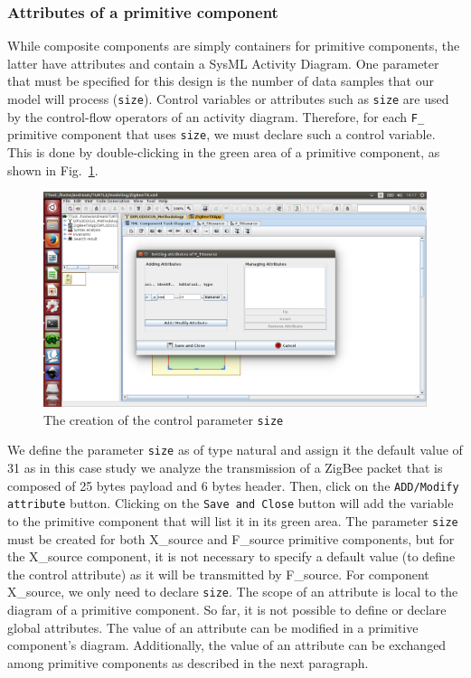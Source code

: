 \documentclass{llncs}
\newcommand{\screenshotsize}{1.0\textwidth}
\begin{document}
\subsubsection{Attributes of a primitive component}
%
While composite components are simply containers for primitive components, the latter have attributes and contain a
SysML Activity Diagram. One parameter that must be specified for this design is
the number of data samples that our model will process (\texttt{size}). Control
variables or attributes such as \texttt{size} are used by the control-flow operators of an activity diagram. Therefore, for each \texttt{F\_} primitive component that uses \texttt{size}, we must
declare such a control variable. This is done by double-clicking in the green area of a primitive component, as shown in
Fig.~\ref{fig:Src3}.
%
\begin{figure}[!htbp]
	\centering
	\includegraphics[width=\screenshotsize]{figures/screenshot/Src3.png}
	\caption{The creation of the control parameter \texttt{size}}
	\label{fig:Src3}
\end{figure}
%
We define the parameter \texttt{size} as of type natural and assign it the default value of 31 as in this case study we
analyze the transmission of a ZigBee packet that is composed of 25 bytes payload and 6 bytes header. Then, click on the
\texttt{ADD/Modify attribute} button. Clicking on the \texttt{Save and Close} button will add the variable to the
primitive component that will list it in its green area. The parameter \texttt{size} must be created for both X\_source
and F\_source primitive components, but for the X\_source component, it is not necessary to specify a default value (to
define the control attribute) as it will be transmitted by F\_source. For component X\_source, we only need to declare
\texttt{size}. The scope of an attribute is local to the diagram of a primitive component. So far, it is not possible to
define or declare global attributes. The value of an attribute can be modified in a primitive component's diagram.
Additionally, the value of an attribute can be exchanged among primitive components as described in the next paragraph.
%
\end{document}
